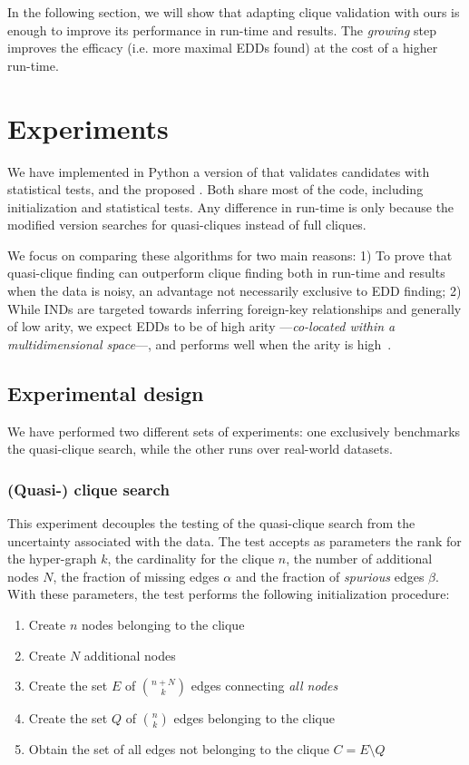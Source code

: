 In the following section, we will show that adapting \Find clique validation with ours
is enough to improve its performance in run-time and results. The \emph{growing}
step improves the efficacy (i.e. more maximal \glspl{EDD} found) at the cost of a higher run-time.

\section{Experiments}
\label{sec:presq_experiments}
We have implemented in Python a version of \Find that validates candidates with statistical
tests, and the proposed \PresQ.
Both share most of the code, including initialization and statistical
tests. Any difference in run-time is only because the modified version
searches for quasi-cliques instead of full cliques.

We focus on comparing these algorithms for two main reasons:
1) To prove that quasi-clique finding can outperform clique finding both in run-time and
results when the data is noisy, an advantage not necessarily exclusive to \gls{EDD} finding;
2) While \glspl{IND} are targeted towards inferring foreign-key relationships and generally of low arity,
we expect \glspl{EDD} to be of high arity ---\emph{co-located within a multidimensional space}---,
and \Find performs well when the arity is high~\cite{Dursch2019}.

\subsection{Experimental design}
\label{sec:experiment_design}
We have performed two different sets of experiments: one exclusively benchmarks the
quasi-clique search, while the other runs over real-world datasets.

\subsubsection{(Quasi-) clique search}
This experiment decouples the testing of the quasi-clique search from the uncertainty
associated with the data. The test accepts as parameters the rank
for the hyper-graph $k$, the cardinality for the clique $n$, the number of additional
nodes $N$, the fraction of missing edges $\alpha$ and the fraction of \emph{spurious}
edges $\beta$.
With these parameters, the test performs the following initialization procedure:

\begin{enumerate}
    \item Create $n$ nodes belonging to the clique
    \item Create $N$ additional nodes
    \item Create the set $E$ of $\binom{n + N}{k}$ edges connecting \emph{all nodes}
    \item Create the set $Q$ of $\binom{n}{k}$ edges belonging to the clique
    \item Obtain the set of all edges not belonging to the clique $C = E \setminus Q$
\end{enumerate}

